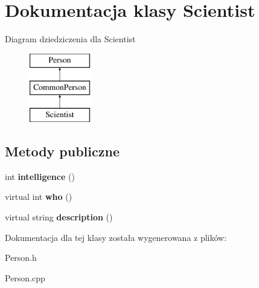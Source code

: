 \hypertarget{classScientist}{}\section{Dokumentacja klasy Scientist}
\label{classScientist}
Diagram dziedziczenia dla Scientist\begin{figure}[H]
\begin{center}
\leavevmode
\includegraphics[height=3.000000cm]{classScientist}
\end{center}
\end{figure}
\subsection*{Metody publiczne}
\begin{DoxyCompactItemize}
\item 
int {\bfseries intelligence} ()\hypertarget{classScientist_a5a8cd2cea36347764ad85328a814c892}{}\label{classScientist_a5a8cd2cea36347764ad85328a814c892}

\item 
virtual int {\bfseries who} ()\hypertarget{classScientist_a8ae5a60d92adca7fa1840ffe369e12ba}{}\label{classScientist_a8ae5a60d92adca7fa1840ffe369e12ba}

\item 
virtual string {\bfseries description} ()\hypertarget{classScientist_a31ff8bf82c31257c1a22e16fcca3da7b}{}\label{classScientist_a31ff8bf82c31257c1a22e16fcca3da7b}

\end{DoxyCompactItemize}


Dokumentacja dla tej klasy została wygenerowana z plików\+:\begin{DoxyCompactItemize}
\item 
Person.\+h\item 
Person.\+cpp\end{DoxyCompactItemize}
